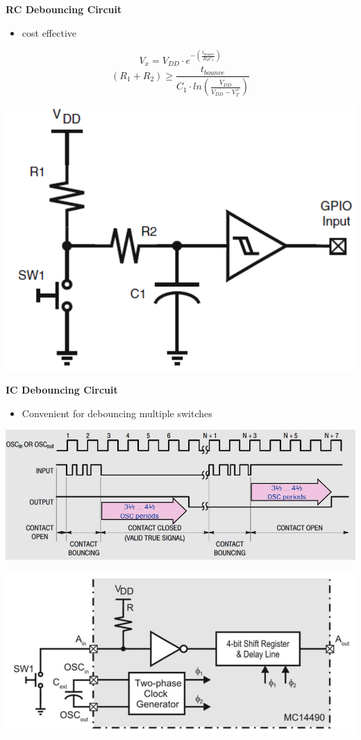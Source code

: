 \textbf{RC Debouncing Circuit}\newline
\begin{minipage}{0.5\linewidth}
    \begin{itemize}
        \item cost effective
    \end{itemize}
    \[ V_x = V_{DD}\cdot e^{-(\frac{t_{bounce}}{R_2 C_1})} \]
    \[ (R_1 + R_2) \geq \frac{t_{bounce}}{C_1 \cdot ln(\frac{V_{DD}}{V_{DD}-V_T^+})} \]
\end{minipage}
\begin{minipage}{0.5\linewidth}
    \includegraphics[width=0.5\linewidth]{images/HWDebounceRC}  
\end{minipage}

\textbf{IC Debouncing Circuit}\newline
\begin{minipage}{0.5\linewidth}
    \begin{itemize}
        \item Convenient for debouncing multiple switches
    \end{itemize}
    \includegraphics[width=0.8\linewidth]{images/HWDebounceICTiming}  
\end{minipage}
\begin{minipage}{0.5\linewidth}
    \includegraphics[width=0.9\linewidth]{images/HWDebounceIC}  
\end{minipage}
